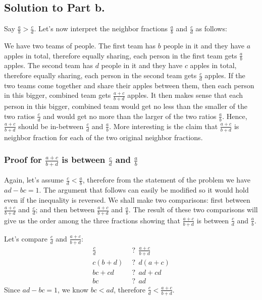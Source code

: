 \documentclass{article}
\begin{document}
\subsection*{Solution to Part b.}
Say $\frac{a}{b} > \frac{c}{d}$. Let's now interpret the neighbor fractions $\frac{a}{b}$ and $\frac{c}{d}$ as follows: 

We have two teams of people. The first team has $b$ people in it and they have $a$ apples in total, therefore equally sharing, each person in the first team gets $\frac{a}{b}$ apples. The second team has $d$ people in it and they have $c$ apples in total, therefore equally sharing, each person in the second team gets $\frac{c}{d}$ apples. If the two teams come together and share their apples between them, then each person in this bigger, combined team gets $\frac{a+c}{b+d}$ apples. It then makes sense that each person in this bigger, combined team would get no less than the smaller of the two ratios $\frac{c}{d}$ and would get no more than the larger of the two ratios $\frac{a}{b}$. Hence, $\frac{a+c}{b+d}$ should be in-between $\frac{c}{d}$ and $\frac{a}{b}$. More interesting is the claim that $\frac{a+c}{b+d}$ is neighbor fraction for each of the two original neighbor fractions.

\subsubsection*{Proof for $\frac{a+c}{b+d}$ is between $\frac{c}{d}$ and $\frac{a}{b}$}

Again, let's assume $\frac{c}{d} < \frac{a}{b}$, therefore from the statement of the problem we have $ad-bc = 1$. The argument that follows can easily be modified so it would hold even if the inequality is reversed. We shall make two comparisons: first between $\frac{a+c}{b+d}$ and $\frac{c}{d}$; and then between $\frac{a+c}{b+d}$ and $\frac{a}{b}$. The result of these two comparisons will give us the order among the three fractions showing that $\frac{a+c}{b+d}$ is between $\frac{c}{d}$ and $\frac{a}{b}$.

Let's compare $\frac{c}{d}$ and $\frac{a+c}{b+d}$:
\begin{displaymath}
\begin{split}
\frac{c}{d}\ \ &?\ \ \frac{a+c}{b+d}\\
     c(b+d)\ \ &?\ \ d(a+c)\\
      bc+cd\ \ &?\ \ ad+cd\\
         bc\ \ &?\ \ ad
\end{split}
\end{displaymath}
Since $ad-bc = 1$, we know $bc < ad$, therefore $\frac{c}{d} < \frac{a+c}{b+d}$.
\end{document}
